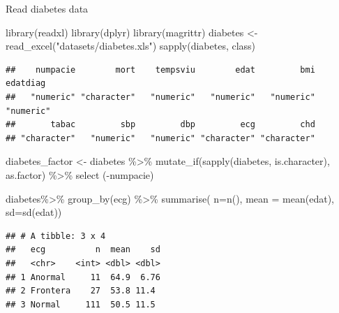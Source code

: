 \documentclass[
  ignorenonframetext,
]{beamer}
\newenvironment{Shaded}{\begin{snugshade}}{\end{snugshade}}
\newcommand{\AttributeTok}[1]{\textcolor[rgb]{0.77,0.63,0.00}{#1}}
\newcommand{\FunctionTok}[1]{\textcolor[rgb]{0.00,0.00,0.00}{#1}}
\newcommand{\NormalTok}[1]{#1}
\newcommand{\OtherTok}[1]{\textcolor[rgb]{0.56,0.35,0.01}{#1}}
\newcommand{\SpecialCharTok}[1]{\textcolor[rgb]{0.00,0.00,0.00}{#1}}
\newcommand{\StringTok}[1]{\textcolor[rgb]{0.31,0.60,0.02}{#1}}
\begin{document}
\begin{frame}[fragile]{Read diabetes data}
\protect\hypertarget{read-diabetes-data}{}
\tiny

\begin{Shaded}
\begin{Highlighting}[]
\FunctionTok{library}\NormalTok{(readxl)}
\FunctionTok{library}\NormalTok{(dplyr)}
\FunctionTok{library}\NormalTok{(magrittr)}
\NormalTok{diabetes }\OtherTok{\textless{}{-}} \FunctionTok{read\_excel}\NormalTok{(}\StringTok{"datasets/diabetes.xls"}\NormalTok{)}
\FunctionTok{sapply}\NormalTok{(diabetes, class)}
\end{Highlighting}
\end{Shaded}

\begin{verbatim}
##    numpacie        mort    tempsviu        edat         bmi    edatdiag 
##   "numeric" "character"   "numeric"   "numeric"   "numeric"   "numeric" 
##       tabac         sbp         dbp         ecg         chd 
## "character"   "numeric"   "numeric" "character" "character"
\end{verbatim}

\begin{Shaded}
\begin{Highlighting}[]
\NormalTok{diabetes\_factor }\OtherTok{\textless{}{-}}\NormalTok{ diabetes }\SpecialCharTok{\%\textgreater{}\%}
  \FunctionTok{mutate\_if}\NormalTok{(}\FunctionTok{sapply}\NormalTok{(diabetes, is.character), as.factor) }\SpecialCharTok{\%\textgreater{}\%}
  \FunctionTok{select}\NormalTok{ (}\SpecialCharTok{{-}}\NormalTok{numpacie)}

\NormalTok{diabetes}\SpecialCharTok{\%\textgreater{}\%} 
  \FunctionTok{group\_by}\NormalTok{(ecg) }\SpecialCharTok{\%\textgreater{}\%} 
  \FunctionTok{summarise}\NormalTok{( }\AttributeTok{n=}\FunctionTok{n}\NormalTok{(),}
    \AttributeTok{mean =} \FunctionTok{mean}\NormalTok{(edat),}
            \AttributeTok{sd=}\FunctionTok{sd}\NormalTok{(edat)) }
\end{Highlighting}
\end{Shaded}

\begin{verbatim}
## # A tibble: 3 x 4
##   ecg          n  mean    sd
##   <chr>    <int> <dbl> <dbl>
## 1 Anormal     11  64.9  6.76
## 2 Frontera    27  53.8 11.4 
## 3 Normal     111  50.5 11.5
\end{verbatim}
\end{frame}
\end{document}
